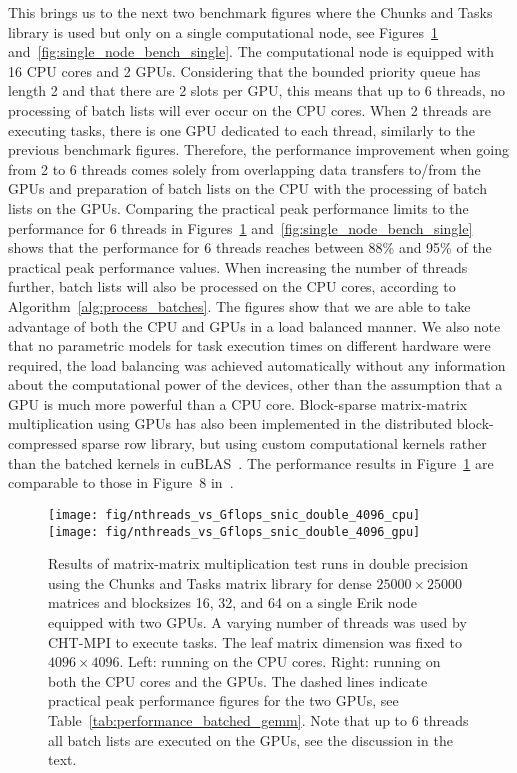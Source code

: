 \documentclass{elsarticle}
\begin{document}
This brings us to the next two benchmark figures where the Chunks and
Tasks library is used but only on a single computational node, see
Figures~\ref{fig:single_node_bench_double}
and~\ref{fig:single_node_bench_single}. The computational node is
equipped with 16 CPU cores and 2 GPUs.  Considering that the bounded
priority queue has length 2 and that there are 2 slots per GPU, this
means that up to 6 threads, no processing of batch lists will ever
occur on the CPU cores.  When 2 threads are executing tasks, there is
one GPU dedicated to each thread, similarly to the previous benchmark
figures.
Therefore, the performance improvement when going from 2 to 6 threads
comes solely from overlapping data transfers to/from the GPUs and
preparation of batch lists on the CPU with the processing of batch
lists on the GPUs. Comparing the practical peak performance limits to
the performance for 6 threads in
Figures~\ref{fig:single_node_bench_double}
and~\ref{fig:single_node_bench_single} shows that the performance for
6 threads reaches between 88\% and 95\% of the practical peak
performance values.
When increasing the number of threads
further, batch lists will also be processed on the CPU cores,
according to Algorithm~\ref{alg:process_batches}.  The figures show
that we are able to take advantage of both the CPU and GPUs in a load
balanced manner. We also note that no parametric models for task
execution times on different hardware were required, the load
balancing was achieved automatically without any information about the
computational power of the devices, other than the assumption that
a GPU is much more powerful than a CPU core. Block-sparse
matrix-matrix multiplication using GPUs has also been implemented in
the distributed block-compressed sparse row library, but using custom
computational kernels rather than the batched kernels in
cuBLAS~\cite{Borstnik2014}. The performance results in
Figure~\ref{fig:single_node_bench_double} are comparable to those in
Figure~8 in~\cite{Borstnik2014}.

\begin{figure}
  \begin{center}
    \texttt{[image: fig/nthreads\_vs\_Gflops\_snic\_double\_4096\_cpu]}
    \texttt{[image: fig/nthreads\_vs\_Gflops\_snic\_double\_4096\_gpu]}
  \end{center}
  \caption{Results of matrix-matrix multiplication test runs in double
    precision using the Chunks and Tasks matrix library for dense $25
    000\times 25 000$ matrices and blocksizes 16, 32, and 64 on a
    single Erik node equipped with two GPUs. A varying number of
    threads was used by CHT-MPI to execute tasks. The leaf matrix
    dimension was fixed to $4096 \times 4096$.  Left: running on the
    CPU cores. Right: running on both the CPU cores and the GPUs. The
    dashed lines indicate practical peak performance figures for the
    two GPUs, see Table~\ref{tab:performance_batched_gemm}. Note that
    up to 6 threads all batch lists are executed on the GPUs, see the
    discussion in the text. \label{fig:single_node_bench_double}}
\end{figure}
\end{document}
